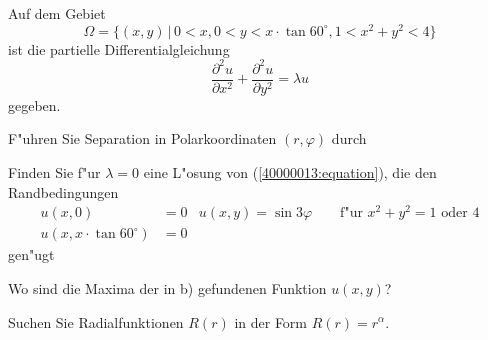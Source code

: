 Auf dem Gebiet 
\[
\Omega = \{(x,y)\,|\, 0<x, 0 < y < x\cdot \tan 60^\circ, 1 < x^2 +y^2 < 4\}
\]
ist die partielle Differentialgleichung
\begin{equation}
\frac{\partial^2u}{\partial x^2}
+
\frac{\partial^2u}{\partial y^2}
=
\lambda u
\label{40000013:equation}
\end{equation}
gegeben.
\begin{teilaufgaben}
\item
F"uhren Sie Separation in Polarkoordinaten $(r,\varphi)$ durch
\item
Finden Sie f"ur $\lambda=0$ eine L"osung von (\ref{40000013:equation}), die
den Randbedingungen
\begin{align*}
u(x,0)&=0&u(x,y)=\sin3\varphi\qquad \text{f"ur $x^2+y^2=1$ oder $4$}\\
u(x,x\cdot \tan 60^\circ)&=0
\end{align*}
gen"ugt
\item
Wo sind die Maxima der in b) gefundenen Funktion $u(x,y)$?
\end{teilaufgaben}

\begin{hinweis}
Suchen Sie Radialfunktionen $R(r)$ in der Form $R(r)=r^\alpha$.
\end{hinweis}


